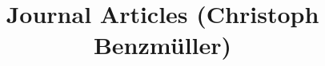 \documentclass{article}
\begin{document}
\title{Journal Articles (Christoph Benzm{\"u}ller)}
\maketitle
\nocite{*}


\end{document}
